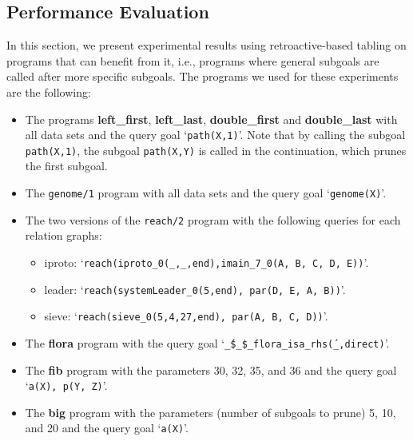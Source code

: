 


\subsection{Performance Evaluation}

In this section, we present experimental results using retroactive-based tabling on programs that
can benefit from it, i.e., programs where general subgoals are called after more specific subgoals.
The programs we used for these experiments are the following:

\begin{itemize}
   \item The programs \textbf{left\_first}, \textbf{left\_last}, \textbf{double\_first} and \textbf{double\_last}
   with all data sets and the query goal `\texttt{path(X,1)}'. Note that by calling the subgoal \texttt{path(X,1)},
   the subgoal \texttt{path(X,Y)} is called in the continuation, which prunes the first subgoal.
   
   \item The \texttt{genome/1} program with all data sets and the query goal `\texttt{genome(X)}'.
   
   \item The two versions of the \texttt{reach/2} program with the following queries for each relation graphs:

   \begin{itemize}
      \item iproto: `\texttt{reach(iproto\_0(\_,\_,end),imain\_7\_0(A,~B,~C,~D,~E))}'.
      \item leader: `\texttt{reach(systemLeader\_0(5,end),~par(D,~E,~A,~B))}'.
      \item sieve: `\texttt{reach(sieve\_0(5,4,27,end),~par(A,~B,~C,~D))}'.
   \end{itemize}
   
   \item The \textbf{flora} program with the query goal `\texttt{\'\_\$\_\$\_flora\_isa\_rhs\'(\_,direct)}'.
   
   \item The \textbf{fib} program with the parameters 30, 32, 35, and 36 and the query goal `\texttt{a(X),~p(Y,~Z)}'.
   
   \item The \textbf{big} program with the parameters (number of subgoals to prune) 5, 10, and 20 and the
   query goal `\texttt{a(X)}'.
\end{itemize}

